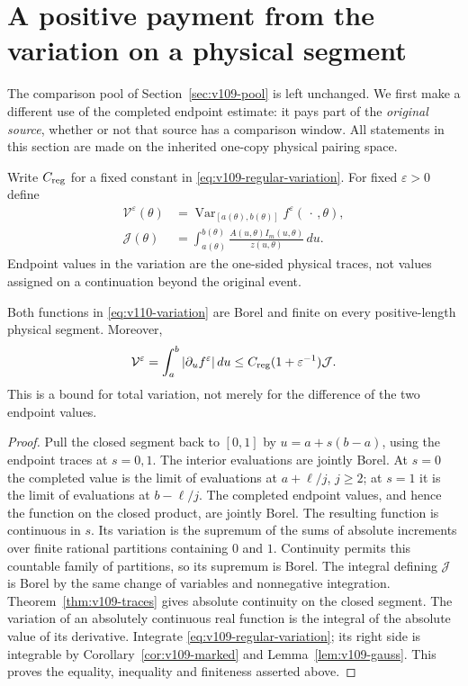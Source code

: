 \section{A positive payment from the variation on a physical segment}
\label{sec:v110-variation}
The comparison pool of Section~\ref{sec:v109-pool} is left unchanged.
We first make a different use of the completed endpoint estimate: it
pays part of the \emph{original source}, whether or not that source
has a comparison window. All statements in this section are made
on the inherited one-copy physical pairing space.

Write $C_{\rm reg}$ for a fixed constant in
\eqref{eq:v109-regular-variation}. For fixed $\varepsilon>0$ define
\begin{equation}\label{eq:v110-variation}
 \begin{split}
 \mathcal V^\varepsilon(\theta)
   &=\operatorname{Var}_{[a(\theta),b(\theta)]}
                         f^\varepsilon(\,\cdot\,,\theta),\\
 \mathcal J(\theta)&=\int_{a(\theta)}^{b(\theta)}
               \frac{A(u,\theta)I_m(u,\theta)}{z(u,\theta)}\,du.
 \end{split}
\end{equation}
Endpoint values in the variation are the one-sided physical traces,
not values assigned on a continuation beyond the original event.

\begin{lemma}
\label{lem:v110-variation}
Both functions in \eqref{eq:v110-variation} are Borel and finite on
every positive-length physical segment. Moreover,
\begin{equation}\label{eq:v110-full-variation}
 \mathcal V^\varepsilon
   =\int_a^b|\partial_u f^\varepsilon|\,du
   \le C_{\rm reg}(1+\varepsilon^{-1})\mathcal J.
\end{equation}
This is a bound for total variation, not merely for the difference
of the two endpoint values.
\end{lemma}
\begin{proof}
Pull the closed segment back to $[0,1]$ by $u=a+s(b-a)$, using the
endpoint traces at $s=0,1$. The interior evaluations are jointly Borel. At $s=0$ the completed
value is the limit of evaluations at $a+\ell/j$, $j\ge2$; at $s=1$
it is the limit of evaluations at $b-\ell/j$. The completed endpoint
values, and hence the function on the closed product, are jointly
Borel. The resulting function is continuous in $s$. Its variation is the supremum of the sums of
absolute increments over finite rational partitions containing
$0$ and $1$. Continuity permits this countable family of partitions,
so its supremum is Borel. The integral defining $\mathcal J$ is
Borel by the same change of variables and nonnegative integration.
Theorem~\ref{thm:v109-traces} gives absolute continuity on the closed
segment. The variation of an absolutely continuous real function is
the integral of the absolute value of its derivative. Integrate
\eqref{eq:v109-regular-variation}; its right side is integrable by
Corollary~\ref{cor:v109-marked} and Lemma~\ref{lem:v109-gauss}.
This proves the equality, inequality and finiteness asserted above.
\end{proof}

